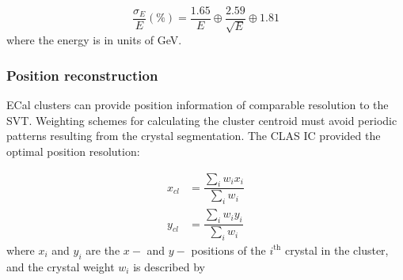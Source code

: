 \begin{equation}
\label{eq:eResUpdated}
\dfrac{\sigma_E}{E} (\%) = \dfrac{1.65}{E} \oplus \dfrac{2.59}{\sqrt{E}} \oplus 1.81 
\end{equation}
where the energy is in units of GeV.

\subsubsection{Position reconstruction}
\indent ECal clusters can provide position information of comparable resolution to the SVT. Weighting schemes for calculating the cluster centroid must avoid periodic patterns resulting from the crystal segmentation. The CLAS IC provided the optimal position resolution:~\cite{szumila-vance_hps_ecal_2014}

\begin{equation}
\begin{split}
\label{eq:posncalc}
x_{cl} & =  \dfrac{\sum_i w_i x_i}{\sum_i w_i}\\
y_{cl} & =  \dfrac{\sum_i w_i y_i}{\sum_i w_i}
\end{split}
\end{equation}
where $x_i$ and $y_i$ are the $x-$ and $y-$ positions of the $i^{\textrm{th}}$ crystal in the cluster, and the crystal weight $w_i$ is described by 

